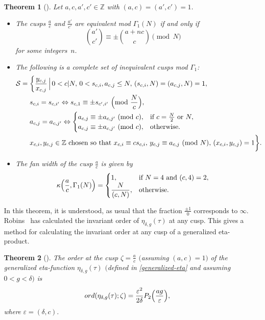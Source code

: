 \documentclass[10pt,a4paper]{amsart}
\numberwithin{equation}{section}
\newtheorem{Theorem}{Theorem}[section]
\theoremstyle{definition}
\begin{document}
\begin{Theorem}[{\cite[Corollary 4]{CKP09}}]\label{Thm-2.2}
Let $a, c, a', c'\in\mathbb{Z}$ with $(a, c)=(a', c')=1$.
\begin{itemize}\itemsep=0pt
 \item[$(i)$] The cusps $\frac{a}{c}$ and $\frac{a'}{c'}$ are equivalent mod $\Gamma_1(N)$ if and only if \[ \binom{a'}{c'}\equiv \pm\binom{a+nc}{c} \pmod N \] for some integers~$n$.
 \item[$(ii)$] The following is a complete set of inequivalent cusps mod $\Gamma_{1}$:
\begin{align*}
\mathcal{S}={} &\biggl\{\frac{y_{c,j}}{x_{c,j}}\,\Bigl|\, 0 < c|N,\, 0 < s_{c,i},a_{c,j}\leq N,\, (s_{c,i},N)=(a_{c,j},N)=1,\\
&s_{c,i}=s_{c,i'}\Leftrightarrow s_{c,1}\equiv\pm s_{c',i'} \ \Big({\rm mod} \ \frac{N}{c}\Big),\\
&a_{c,j}=a_{c,j'}\Leftrightarrow \begin{cases}
a_{c,j}\equiv\pm a_{c,j'} \ ({\rm mod}~c), & \text{if}~c=\frac{N}{2}~\text{or}~ N,\\
a_{c,j}\equiv\pm a_{c,j'}\ ({\rm mod}~c), & \text{otherwise}.\end{cases}\\
&x_{c,i},y_{c,j}\in\mathbb{Z}~\text{chosen so that}~x_{c,i}\equiv cs_{c,i} ,\,  y_{c,j}\equiv a_{c,j}\ ({\rm mod}~N), \, (x_{c,i},y_{c,j})=1\biggr\}.
\end{align*}
 \item[(iii)] The fan width of the cusp $\frac{a}{c}$ is given by
\begin{align*}
\kappa\Bigl(\frac{a}{c},\Gamma_1(N)\Bigr)=\begin{cases}
1, &\text{if}~N=4~\text{and}~(c,4)=2,\\
\dfrac{N}{(c,N)}, &\text{otherwise}.\end{cases}
\end{align*}
\end{itemize}
\end{Theorem}
In this theorem, it is understood, as usual that the fraction $\frac{\pm 1}{0}$ corresponds to $\infty$. Robins~\cite{Ro94} has calculated the invariant order of $\eta_{\delta,g}(\tau)$ at any cusp. This gives a method for calculating the invariant order at any cusp of a generalized eta-product.
\begin{Theorem}[\cite{Ro94}]\label{Thm-2.3}
The order at the cusp $\zeta=\frac{a}{c}$ $($assuming $(a,c)=1)$ of the generalized eta-function $\eta_{\delta,g}(\tau)$ $($defined in \eqref{generalized-eta} and assuming $0 < g < \delta)$ is
\begin{align*}
ord(\eta_{\delta,g}(\tau);\zeta)=\frac{\varepsilon^2}{2\delta}P_2\Bigl(\frac{ag}{\varepsilon}\Bigr),
\end{align*}
where $\varepsilon=(\delta,c)$.
\end{Theorem}
\end{document}
